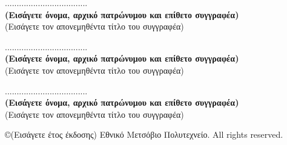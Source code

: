 \documentclass[12pt, twoside, a4paper]{report}
\begin{document}
\vspace{30ex}
\noindent
................................... \\
\textbf{(Εισάγετε όνομα, αρχικό πατρώνυμου και επίθετο συγγραφέα)} \\
(Εισάγετε τον απονεμηθέντα τίτλο του συγγραφέα) \\
\vspace{8ex}

\noindent
................................... \\
\textbf{(Εισάγετε όνομα, αρχικό πατρώνυμου και επίθετο συγγραφέα)} \\
(Εισάγετε τον απονεμηθέντα τίτλο του συγγραφέα) \\
\vspace{8ex}

\noindent
................................... \\
\textbf{(Εισάγετε όνομα, αρχικό πατρώνυμου και επίθετο συγγραφέα)} \\
(Εισάγετε τον απονεμηθέντα τίτλο του συγγραφέα) \\
\vspace{26ex}

\small
\noindent
\copyright \hspace{1em}(Εισάγετε έτος έκδοσης) Εθνικό Μετσόβιο Πολυτεχνείο.
All rights reserved.



\newpage
\thispagestyle{empty}
\mbox{}
\newpage

\tableofcontents
\newpage
\listoffigures
\end{document}
